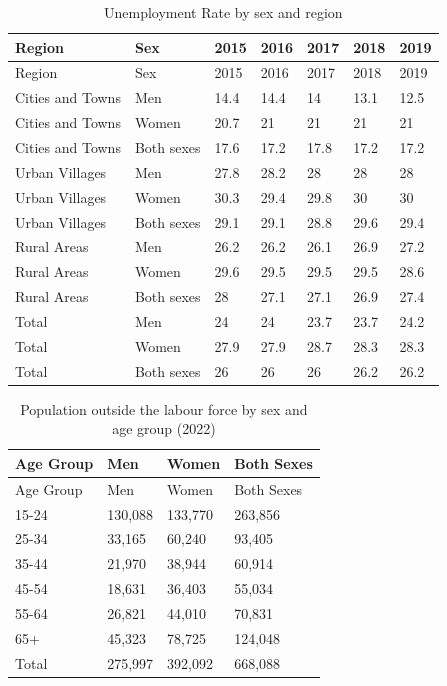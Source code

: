 \documentclass[
]{book}
\theoremstyle{definition}
\theoremstyle{definition}
\theoremstyle{definition}
\theoremstyle{definition}
\theoremstyle{remark}
\begin{document}
\begin{longtable}[]{@{}lllllll@{}}
\caption{\label{tab:table41} Unemployment Rate by sex and region}\tabularnewline
\toprule()
Region & Sex & 2015 & 2016 & 2017 & 2018 & 2019 \\
\midrule()
\endfirsthead
\toprule()
Region & Sex & 2015 & 2016 & 2017 & 2018 & 2019 \\
\midrule()
\endhead
Cities and Towns & Men & 14.4 & 14.4 & 14 & 13.1 & 12.5 \\
Cities and Towns & Women & 20.7 & 21 & 21 & 21 & 21 \\
Cities and Towns & Both sexes & 17.6 & 17.2 & 17.8 & 17.2 & 17.2 \\
Urban Villages & Men & 27.8 & 28.2 & 28 & 28 & 28 \\
Urban Villages & Women & 30.3 & 29.4 & 29.8 & 30 & 30 \\
Urban Villages & Both sexes & 29.1 & 29.1 & 28.8 & 29.6 & 29.4 \\
Rural Areas & Men & 26.2 & 26.2 & 26.1 & 26.9 & 27.2 \\
Rural Areas & Women & 29.6 & 29.5 & 29.5 & 29.5 & 28.6 \\
Rural Areas & Both sexes & 28 & 27.1 & 27.1 & 26.9 & 27.4 \\
Total & Men & 24 & 24 & 23.7 & 23.7 & 24.2 \\
Total & Women & 27.9 & 27.9 & 28.7 & 28.3 & 28.3 \\
Total & Both sexes & 26 & 26 & 26 & 26.2 & 26.2 \\
\bottomrule()
\end{longtable}

\begin{longtable}[]{@{}llll@{}}
\caption{\label{tab:table42} Population outside the labour force by sex and age group (2022)}\tabularnewline
\toprule()
Age Group & Men & Women & Both Sexes \\
\midrule()
\endfirsthead
\toprule()
Age Group & Men & Women & Both Sexes \\
\midrule()
\endhead
15-24 & 130,088 & 133,770 & 263,856 \\
25-34 & 33,165 & 60,240 & 93,405 \\
35-44 & 21,970 & 38,944 & 60,914 \\
45-54 & 18,631 & 36,403 & 55,034 \\
55-64 & 26,821 & 44,010 & 70,831 \\
65+ & 45,323 & 78,725 & 124,048 \\
Total & 275,997 & 392,092 & 668,088 \\
\bottomrule()
\end{longtable}
\end{document}
